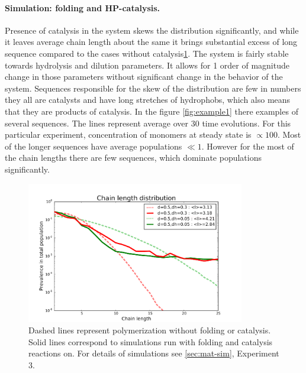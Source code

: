 \documentclass[12pt]{paper}
\begin{document}
\paragraph{Simulation: folding and HP-catalysis.} Presence of catalysis in the system skews the 
distribution significantly, and while it leaves average chain length about the same it brings 
substantial excess of long sequence compared to the cases without catalysis\ref{fig:sim.flory-hp}. 
The system is fairly stable towards hydrolysis and dilution parameters. It allows for 1 order of 
magnitude change in those parameters without significant change in the behavior of the system. 
Sequences responsible for the skew of the distribution are few in numbers they all are catalysts 
and have long stretches of hydrophobs, which also means that they are products of catalysis. In 
the figure \ref{fig:example1} there examples of several sequences. The lines represent average 
over 30 time evolutions. For this particular experiment, concentration of monomers at steady 
state is $\propto 100$. Most of the longer sequences have average populations $\ll 1$. However for 
the most of the chain lengths there are few sequences, which dominate populations significantly.
\begin{figure}[h!]
  \centering
  \includegraphics[width=0.85\textwidth]{pictures/flory-and-hp.pdf} 
  \caption{Dashed lines represent polymerization without folding or catalysis. Solid lines 
correspond to simulations run with folding and catalysis reactions on. For details of simulations 
see \ref{sec:mat-sim}, Experiment 3. }
  \label{fig:sim.flory-hp}
\end{figure}
\end{document}
